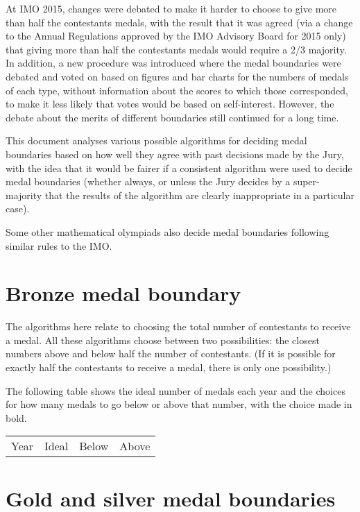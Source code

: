 \documentclass[a4paper,11pt]{article}
\begin{document}
At IMO 2015, changes were debated to make it harder to choose to give
more than half the contestants medals, with the result that it was
agreed (via a change to the Annual Regulations approved by the IMO
Advisory Board for 2015 only) that giving more than half the
contestants medals would require a 2/3 majority.  In addition, a new
procedure was introduced where the medal boundaries were debated and
voted on based on figures and bar charts for the numbers of medals of
each type, without information about the scores to which those
corresponded, to make it less likely that votes would be based on
self-interest.  However, the debate about the merits of different
boundaries still continued for a long time.

This document analyses various possible algorithms for deciding medal
boundaries based on how well they agree with past decisions made by
the Jury, with the idea that it would be fairer if a consistent
algorithm were used to decide medal boundaries (whether always, or
unless the Jury decides by a super-majority that the results of the
algorithm are clearly inappropriate in a particular case).

Some other mathematical olympiads also decide medal boundaries
following similar rules to the IMO.

\section*{Bronze medal boundary}

The algorithms here relate to choosing the total number of contestants
to receive a medal.  All these algorithms choose between two
possibilities: the closest numbers above and below half the number of
contestants.  (If it is possible for exactly half the contestants to
receive a medal, there is only one possibility.)

The following table shows the ideal number of medals each year and the
choices for how many medals to go below or above that number, with the
choice made in bold.

\begin{tabular}{cccc}
Year & Ideal & Below & Above \\

\end{tabular}

\section*{Gold and silver medal boundaries}
\end{document}
